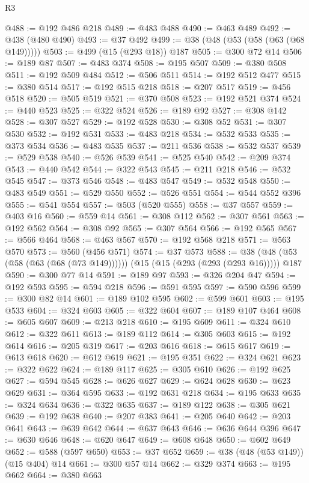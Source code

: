 \begin{lexlean}{R3}
\begin{coremodule}
@488 := @192 @486 @218
@489 := @483 @488
@490 := @463 @489
@492 := @438 (@480 @490)
@493 := @37 @492
@499 := @38 (@48 (@53 (@58 (@63 (@68 @149)))))
@503 := @499 (@15 (@293 @18)) @187
@505 := @300 @72 @14
@506 := @189 @87
@507 := @483 @374
@508 := @195 @507
@509 := @380 @508
@511 := @192 @509 @484
@512 := @506 @511
@514 := @192 @512 @477
@515 := @380 @514
@517 := @192 @515 @218
@518 := @207 @517
@519 := @456 @518
@520 := @505 @519
@521 := @370 @508
@523 := @192 @521 @374
@524 := @440 @523
@525 := @322 @524
@526 := @189 @92
@527 := @308 @142
@528 := @307 @527
@529 := @192 @528
@530 := @308 @52
@531 := @307 @530
@532 := @192 @531
@533 := @483 @218
@534 := @532 @533
@535 := @373 @534
@536 := @483 @535
@537 := @211 @536
@538 := @532 @537
@539 := @529 @538
@540 := @526 @539
@541 := @525 @540
@542 := @209 @374
@543 := @440 @542
@544 := @322 @543
@545 := @211 @218
@546 := @532 @545
@547 := @373 @546
@548 := @483 @547
@549 := @532 @548
@550 := @483 @549
@551 := @529 @550
@552 := @526 @551
@554 := @544 @552 @396
@555 := @541 @554
@557 := @503 (@520 @555)
@558 := @37 @557
@559 := @403 @16
@560 := @559 @14
@561 := @308 @112
@562 := @307 @561
@563 := @192 @562
@564 := @308 @92
@565 := @307 @564
@566 := @192 @565
@567 := @566 @464
@568 := @463 @567
@570 := @192 @568 @218
@571 := @563 @570
@573 := @560 (@456 @571)
@574 := @37 @573
@588 := @38 (@48 (@53 (@58 (@63 (@68 (@73 @149)))))) (@15 (@15 (@293 (@293 (@293 @16))))) @187
@590 := @300 @77 @14
@591 := @189 @97
@593 := @326 @204 @47
@594 := @192 @593
@595 := @594 @218
@596 := @591 @595
@597 := @590 @596
@599 := @300 @82 @14
@601 := @189 @102 @595
@602 := @599 @601
@603 := @195 @533
@604 := @324 @603
@605 := @322 @604
@607 := @189 @107 @464
@608 := @605 @607
@609 := @213 @218
@610 := @195 @609
@611 := @324 @610
@612 := @322 @611
@613 := @189 @112
@614 := @305 @603
@615 := @192 @614
@616 := @205 @319
@617 := @203 @616
@618 := @615 @617
@619 := @613 @618
@620 := @612 @619
@621 := @195 @351
@622 := @324 @621
@623 := @322 @622
@624 := @189 @117
@625 := @305 @610
@626 := @192 @625
@627 := @594 @545
@628 := @626 @627
@629 := @624 @628
@630 := @623 @629
@631 := @364 @595
@633 := @192 @631 @218
@634 := @195 @633
@635 := @324 @634
@636 := @322 @635
@637 := @189 @122
@638 := @305 @621
@639 := @192 @638
@640 := @207 @383
@641 := @205 @640
@642 := @203 @641
@643 := @639 @642
@644 := @637 @643
@646 := @636 @644 @396
@647 := @630 @646
@648 := @620 @647
@649 := @608 @648
@650 := @602 @649
@652 := @588 (@597 @650)
@653 := @37 @652
@659 := @38 (@48 (@53 @149)) (@15 @404) @14
@661 := @300 @57 @14
@662 := @329 @374
@663 := @195 @662
@664 := @380 @663

\end{coremodule}
\end{lexlean}
